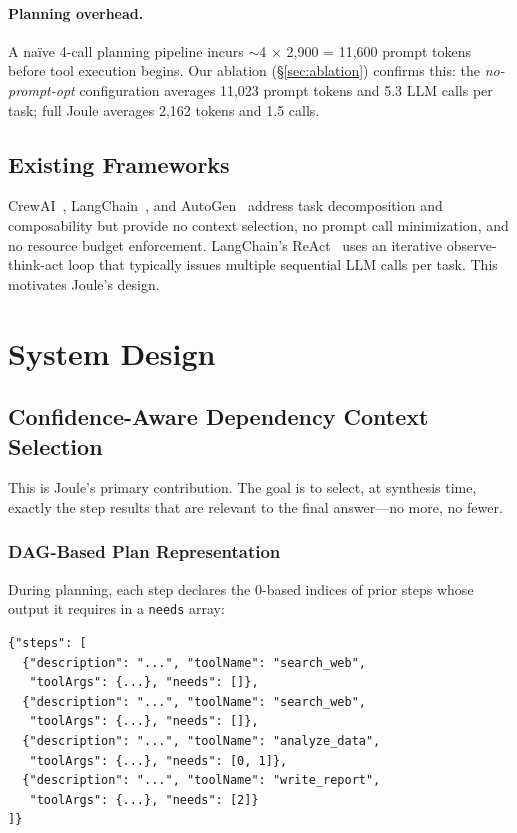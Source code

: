 \documentclass[sigconf,authordraft]{acmart}
\begin{document}
\paragraph{Planning overhead.}
A na\"{i}ve 4-call planning pipeline incurs $\sim$4 $\times$ 2,900 = 11,600 prompt tokens before tool execution begins.
Our ablation (\S\ref{sec:ablation}) confirms this: the \emph{no-prompt-opt} configuration averages 11,023 prompt tokens and 5.3 LLM calls per task; full Joule averages 2,162 tokens and 1.5 calls.

\subsection{Existing Frameworks}
CrewAI~\cite{crewai}, LangChain~\cite{langchain}, and AutoGen~\cite{autogen} address task decomposition and composability but provide no context selection, no prompt call minimization, and no resource budget enforcement.
LangChain's ReAct~\cite{yao2022react} uses an iterative observe-think-act loop that typically issues multiple sequential LLM calls per task.
This motivates Joule's design.

\section{System Design}
\label{sec:system}

\subsection{Confidence-Aware Dependency Context Selection}
\label{sec:pruning}

This is Joule's primary contribution.
The goal is to select, at synthesis time, exactly the step results that are relevant to the final answer---no more, no fewer.

\subsubsection{DAG-Based Plan Representation}

During planning, each step declares the 0-based indices of prior steps whose output it requires in a \texttt{needs} array:

\begin{verbatim}
{"steps": [
  {"description": "...", "toolName": "search_web",
   "toolArgs": {...}, "needs": []},
  {"description": "...", "toolName": "search_web",
   "toolArgs": {...}, "needs": []},
  {"description": "...", "toolName": "analyze_data",
   "toolArgs": {...}, "needs": [0, 1]},
  {"description": "...", "toolName": "write_report",
   "toolArgs": {...}, "needs": [2]}
]}
\end{verbatim}
\end{document}
